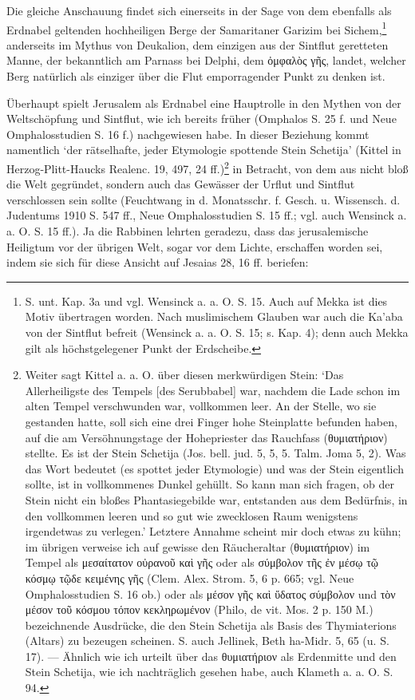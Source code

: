 \documentclass[a4paper, 11pt, oneside]{article}
\begin{document}
Die gleiche Anschauung findet sich einerseits in der Sage von dem ebenfalls als Erdnabel geltenden hochheiligen Berge der Samaritaner Garizim bei Sichem,\footnote{S. unt. Kap. 3a und vgl. Wensinck a. a. O. S. 15. Auch auf Mekka ist dies Motiv übertragen worden. Nach muslimischem Glauben war auch die Ka'aba von der Sintflut befreit (Wensinck a. a. O. S. 15; s. Kap. 4); denn auch Mekka gilt als höchstgelegener Punkt der Erdscheibe.} anderseits im Mythus von Deukalion, dem einzigen aus der Sintflut geretteten Manne, der bekanntlich am Parnass bei Delphi, dem ὀμφαλὸς γῆς, landet, welcher Berg natürlich als einziger über die Flut emporragender Punkt zu denken ist.

Überhaupt spielt Jerusalem als Erdnabel eine Hauptrolle in den Mythen von der Weltschöpfung und Sintflut, wie ich bereits früher (Omphalos S. 25 f. und Neue Omphalosstudien S. 16 f.) nachgewiesen habe. In dieser Beziehung kommt namentlich `der rätselhafte, jeder Etymologie spottende Stein Schetija' (Kittel in Herzog-Plitt-Haucks Realenc. 19, 497, 24 ff.)\footnote{Weiter sagt Kittel a. a. O. über diesen merkwürdigen Stein: `Das Allerheiligste des Tempels [des Serubbabel] war, nachdem die Lade schon im alten Tempel verschwunden war, vollkommen leer. An der Stelle, wo sie gestanden hatte, soll sich eine drei Finger hohe Steinplatte befunden haben, auf die am Versöhnungstage der Hohepriester das Rauchfass (θυμιατήριον) stellte. Es ist der Stein Schetija (Jos. bell. jud. 5, 5, 5. Talm. Joma 5, 2). Was das Wort bedeutet (es spottet jeder Etymologie) und was der Stein eigentlich sollte, ist in vollkommenes Dunkel gehüllt. So kann man sich fragen, ob der Stein nicht ein bloßes Phantasiegebilde war, entstanden aus dem Bedürfnis, in den vollkommen leeren und so gut wie zwecklosen Raum wenigstens irgendetwas zu verlegen.' Letztere Annahme scheint mir doch etwas zu kühn; im übrigen verweise ich auf gewisse den Räucheraltar (θυμιατήριον) im Tempel als μεσαίτατον οὐρανοῦ καὶ γῆς oder als σύμβολον τῆς ἐν μέσῳ τῷ κόσμῳ τῷδε κειμένης γῆς (Clem. Alex. Strom. 5, 6 p. 665; vgl. Neue Omphalosstudien S. 16 ob.) oder als μέσον γῆς καὶ ὕδατος σύμβολον und τὸν μέσον τοῦ κόσμου τόπον κεκληρωμένον (Philo, de vit. Mos. 2 p. 150 M.) bezeichnende Ausdrücke, die den Stein Schetija als Basis des Thymiaterions (Altars) zu bezeugen scheinen. S. auch Jellinek, Beth ha-Midr. 5, 65 (u. S. 17). --- Ähnlich wie ich urteilt über das θυμιατήριον als Erdenmitte und den Stein Schetija, wie ich nachträglich gesehen habe, auch Klameth a. a. O. S. 94.} in Betracht, von dem aus nicht bloß die Welt gegründet, sondern auch das Gewässer der Urflut und Sintflut verschlossen sein sollte (Feuchtwang in d. Monatsschr. f. Gesch. u. Wissensch. d. Judentums 1910 S. 547 ff., Neue Omphalosstudien S. 15 ff.; vgl. auch Wensinck a. a. O. S. 15 ff.). Ja die Rabbinen lehrten geradezu, dass das jerusalemische Heiligtum vor der übrigen Welt, sogar vor dem Lichte, erschaffen worden sei, indem sie sich für diese Ansicht auf Jesaias 28, 16 ff. beriefen:
\end{document}
